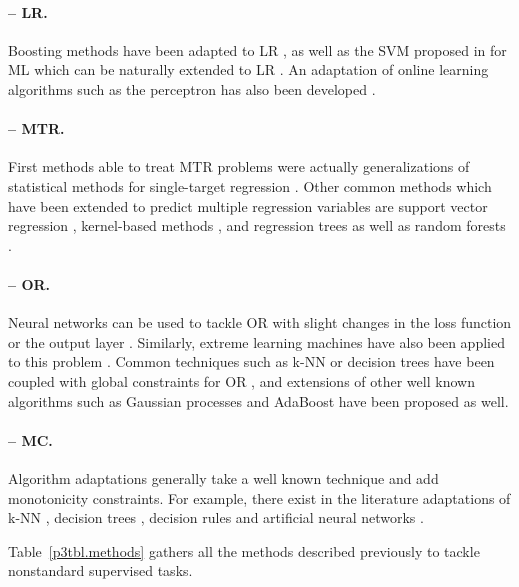 \paragraph{-- LR.} Boosting methods have been adapted to LR \cite{lr-boost}, as well as the SVM proposed in \cite{ml-svm} for ML which can be naturally extended to LR \cite{lranksurvey}. An adaptation of online learning algorithms such as the perceptron has also been developed \cite{lr-online}.

\paragraph{-- MTR.} First methods able to treat MTR problems were actually generalizations of statistical methods for single-target regression \cite{mtr-rank,mtr-canon}. Other common methods which have been extended to predict multiple regression variables are support vector regression \cite{mtr-svr1,mtr-svr2}, kernel-based methods \cite{mtr-kern1,mtr-kern2}, and regression trees \cite{mtr-trees} as well as random forests \cite{mtr-rf}.

\paragraph{-- OR.} Neural networks can be used to tackle OR with slight changes in the loss function or the output layer \cite{or-nn,or-nn2}. Similarly, extreme learning machines have also been applied to this problem \cite{or-elm,or-elm2}. Common techniques such as k-NN or decision trees have been coupled with global constraints for OR \cite{or-knn-dt}, and extensions of other well known algorithms such as Gaussian processes \cite{or-gp} and AdaBoost \cite{or-ada} have been proposed as well.

\paragraph{-- MC.} Algorithm adaptations generally take a well known technique and add monotonicity constraints. For example, there exist in the literature adaptations of k-NN \cite{mc-knn}, decision trees \cite{mc-trees}, decision rules \cite{mc-rules,mc-rules2} and artificial neural networks \cite{mc-monnets}.

\vspace{1em}

Table~\ref{p3tbl.methods} gathers all the methods described previously to tackle nonstandard supervised tasks.

